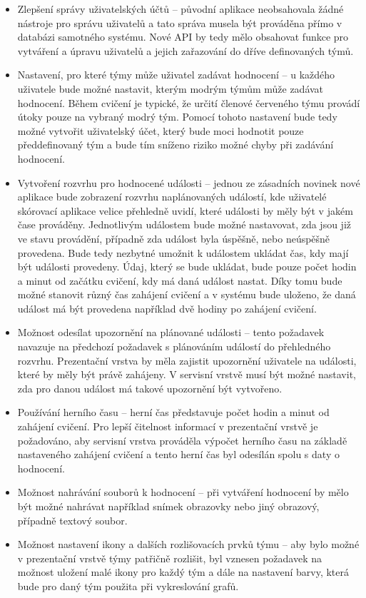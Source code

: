 \documentclass[
  digital, %
  twoside, %
  table,   %
  lof,     %
  lot,     %
]{fithesis3}
\begin{document}
\begin{itemize}
\item Zlepšení správy uživatelských účtů -- původní aplikace neobsahovala žádné nástroje pro správu uživatelů a tato správa musela být prováděna přímo v databázi samotného systému. Nové API by tedy mělo obsahovat funkce pro vytváření a úpravu uživatelů a jejich zařazování do dříve definovaných týmů.
\item Nastavení, pro které týmy může uživatel zadávat hodnocení -- u každého uživatele bude možné nastavit, kterým modrým týmům může zadávat hodnocení. Během cvičení je typické, že určití členové červeného týmu provádí útoky pouze na vybraný modrý tým. Pomocí tohoto nastavení bude tedy možné vytvořit uživatelský účet, který bude moci hodnotit pouze předdefinovaný tým a bude tím sníženo riziko možné chyby při zadávání hodnocení.
\item Vytvoření rozvrhu pro hodnocené události -- jednou ze zásadních novinek nové aplikace bude zobrazení rozvrhu naplánovaných událostí, kde uživatelé skórovací aplikace velice přehledně uvidí, které události by měly být v jakém čase prováděny. Jednotlivým událostem bude možné nastavovat, zda jsou již ve stavu provádění, případně zda událost byla úspěšně, nebo neúspěšně provedena. Bude tedy nezbytné umožnit k událostem ukládat čas, kdy mají být události provedeny. Údaj, který se bude ukládat, bude pouze počet hodin a minut od začátku cvičení, kdy má daná událost nastat. Díky tomu bude možné stanovit různý čas zahájení cvičení a v systému bude uloženo, že daná událost má být provedena například dvě hodiny po zahájení cvičení.
\item Možnost odesílat upozornění na plánované události -- tento požadavek navazuje na předchozí požadavek s plánováním událostí do přehledného rozvrhu. Prezentační vrstva by měla zajistit upozornění uživatele na události, které by měly být právě zahájeny. V servisní vrstvě musí být možné nastavit, zda pro danou událost má takové upozornění být vytvořeno.
\item Používání herního času -- herní čas představuje počet hodin a minut od zahájení cvičení. Pro lepší čitelnost informací v prezentační vrstvě je požadováno, aby servisní vrstva prováděla výpočet herního času na základě nastaveného zahájení cvičení a tento herní čas byl odesílán spolu s daty o hodnocení.
\item Možnost nahrávání souborů k hodnocení – při vytváření hodnocení by mělo být možné nahrávat například snímek obrazovky nebo jiný obrazový, případně textový soubor.
\item Možnost nastavení ikony a dalších rozlišovacích prvků týmu -- aby bylo možné v prezentační vrstvě týmy patřičně rozlišit, byl vznesen požadavek na možnost uložení malé ikony pro každý tým a dále na nastavení barvy, která bude pro daný tým použita při vykreslování grafů.
\end{itemize}
\end{document}
